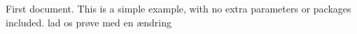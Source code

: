 \documentclass{article}
\begin{document}
First document. This is a simple example, with no 
extra parameters or packages included.
lad os prøve med en ændring
\end{document}
